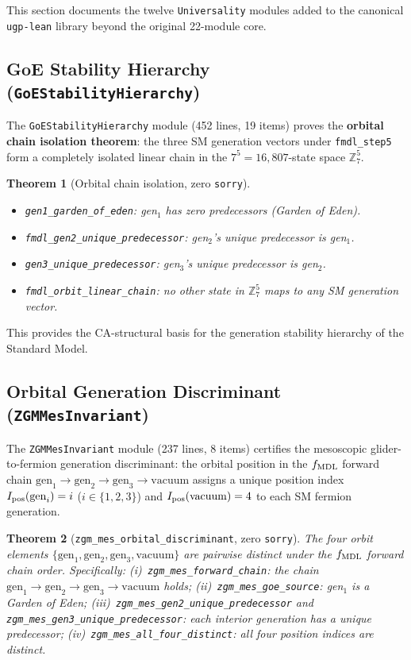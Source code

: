 \documentclass[11pt,a4paper]{article}
\newtheorem{theorem}{Theorem}[section]
\theoremstyle{definition}
\begin{document}
This section documents the twelve \texttt{Universality} modules added to the
canonical \texttt{ugp-lean} library beyond the original 22-module core.

\subsection{GoE Stability Hierarchy (\texttt{GoEStabilityHierarchy})}\label{subsec:goe-stability}

The \texttt{GoEStabilityHierarchy} module (452 lines, 19 items) proves the
\textbf{orbital chain isolation theorem}: the three SM generation vectors under
\lstinline|fmdl_step5| form a completely isolated linear chain in the
$7^5 = 16{,}807$-state space $\mathbb{Z}_7^5$.

\begin{theorem}[Orbital chain isolation, zero \texttt{sorry}]
\begin{itemize}[nosep]
\item \lstinline|gen1_garden_of_eden|: gen$_1$ has zero predecessors (Garden of Eden).
\item \lstinline|fmdl_gen2_unique_predecessor|: gen$_2$'s unique predecessor is gen$_1$.
\item \lstinline|gen3_unique_predecessor|: gen$_3$'s unique predecessor is gen$_2$.
\item \lstinline|fmdl_orbit_linear_chain|: no other state in $\mathbb{Z}_7^5$ maps
  to any SM generation vector.
\end{itemize}
\end{theorem}

This provides the CA-structural basis for the generation stability hierarchy
of the Standard Model.

\subsection{Orbital Generation Discriminant (\texttt{ZGMMesInvariant})}\label{subsec:zgm-mes-invariant}

The \texttt{ZGMMesInvariant} module (237 lines, 8 items) certifies the
mesoscopic glider-to-fermion generation discriminant: the orbital position
in the $f_{\rm MDL}$ forward chain $\mathrm{gen}_1 \to \mathrm{gen}_2 \to
\mathrm{gen}_3 \to \mathrm{vacuum}$ assigns a unique position index
$I_{\rm pos}(\mathrm{gen}_i) = i$ ($i \in \{1,2,3\}$) and
$I_{\rm pos}(\mathrm{vacuum}) = 4$ to each SM fermion generation.

\begin{theorem}[\lstinline|zgm_mes_orbital_discriminant|, zero \texttt{sorry}]
The four orbit elements $\{\mathrm{gen}_1, \mathrm{gen}_2, \mathrm{gen}_3,
\mathrm{vacuum}\}$ are pairwise distinct under the $f_{\rm MDL}$ forward chain
order.  Specifically: (i)~\lstinline|zgm_mes_forward_chain|: the chain
$\mathrm{gen}_1 \to \mathrm{gen}_2 \to \mathrm{gen}_3 \to \mathrm{vacuum}$ holds;
(ii)~\lstinline|zgm_mes_goe_source|: gen$_1$ is a Garden of Eden;
(iii)~\lstinline|zgm_mes_gen2_unique_predecessor| and
\lstinline|zgm_mes_gen3_unique_predecessor|: each interior generation has a
unique predecessor; (iv)~\lstinline|zgm_mes_all_four_distinct|: all four
position indices are distinct.
\end{theorem}
\end{document}
